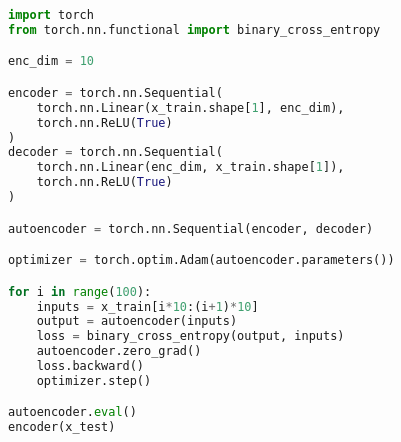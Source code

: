 \begin{lstlisting}[language=Python]
import torch
from torch.nn.functional import binary_cross_entropy

enc_dim = 10

encoder = torch.nn.Sequential(
    torch.nn.Linear(x_train.shape[1], enc_dim),
    torch.nn.ReLU(True)
)
decoder = torch.nn.Sequential(
    torch.nn.Linear(enc_dim, x_train.shape[1]),
    torch.nn.ReLU(True)
)

autoencoder = torch.nn.Sequential(encoder, decoder)

optimizer = torch.optim.Adam(autoencoder.parameters())

for i in range(100):
    inputs = x_train[i*10:(i+1)*10]
    output = autoencoder(inputs)
    loss = binary_cross_entropy(output, inputs)
    autoencoder.zero_grad()
    loss.backward()
    optimizer.step()

autoencoder.eval()
encoder(x_test)
\end{lstlisting}

